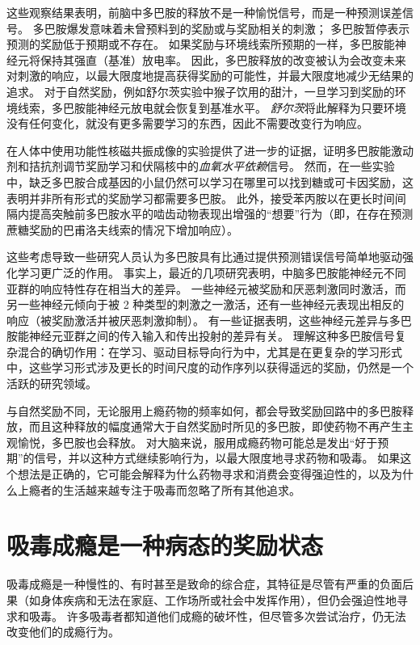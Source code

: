 这些观察结果表明，前脑中多巴胺的释放不是一种愉悦信号，而是一种预测误差信号。
多巴胺爆发意味着未曾预料到的奖励或与奖励相关的刺激；
多巴胺暂停表示预测的奖励低于预期或不存在。
如果奖励与环境线索所预期的一样，多巴胺能神经元将保持其强直（基准）放电率。
因此，多巴胺释放的改变被认为会改变未来对刺激的响应，以最大限度地提高获得奖励的可能性，并最大限度地减少无结果的追求。
对于自然奖励，例如舒尔茨实验中猴子饮用的甜汁，一旦学习到奖励的环境线索，多巴胺能神经元放电就会恢复到基准水平。
\textit{舒尔茨}将此解释为只要环境没有任何变化，就没有更多需要学习的东西，因此不需要改变行为响应。


在人体中使用功能性核磁共振成像的实验提供了进一步的证据，证明多巴胺能激动剂和拮抗剂调节奖励学习和伏隔核中的\textit{血氧水平依赖}信号。
然而，在一些实验中，缺乏多巴胺合成基因的小鼠仍然可以学习在哪里可以找到糖或可卡因奖励，这表明并非所有形式的奖励学习都需要多巴胺。
此外，接受苯丙胺以在更长时间间隔内提高突触前多巴胺水平的啮齿动物表现出增强的“想要”行为（即，在存在预测蔗糖奖励的巴甫洛夫线索的情况下增加响应）。


这些考虑导致一些研究人员认为多巴胺具有比通过提供预测错误信号简单地驱动强化学习更广泛的作用。
事实上，最近的几项研究表明，中脑多巴胺能神经元不同亚群的响应特性存在相当大的差异。
一些神经元被奖励和厌恶刺激同时激活，而另一些神经元倾向于被 2 种类型的刺激之一激活，还有一些神经元表现出相反的响应（被奖励激活并被厌恶刺激抑制）。
有一些证据表明，这些神经元差异与多巴胺能神经元亚群之间的传入输入和传出投射的差异有关。
理解这种多巴胺信号复杂混合的确切作用：在学习、驱动目标导向行为中，尤其是在更复杂的学习形式中，这些学习形式涉及更长的时间尺度的动作序列以获得遥远的奖励，仍然是一个活跃的研究领域。


与自然奖励不同，无论服用上瘾药物的频率如何，都会导致奖励回路中的多巴胺释放，而且这种释放的幅度通常大于自然奖励时所见的多巴胺，即使药物不再产生主观愉悦，多巴胺也会释放。
对大脑来说，服用成瘾药物可能总是发出“好于预期”的信号，并以这种方式继续影响行为，以最大限度地寻求药物和吸毒。
如果这个想法是正确的，它可能会解释为什么药物寻求和消费会变得强迫性的，以及为什么上瘾者的生活越来越专注于吸毒而忽略了所有其他追求。



\section{吸毒成瘾是一种病态的奖励状态}

吸毒成瘾是一种慢性的、有时甚至是致命的综合症，其特征是尽管有严重的负面后果（如身体疾病和无法在家庭、工作场所或社会中发挥作用），但仍会强迫性地寻求和吸毒。
许多吸毒者都知道他们成瘾的破坏性，但尽管多次尝试治疗，仍无法改变他们的成瘾行为。


